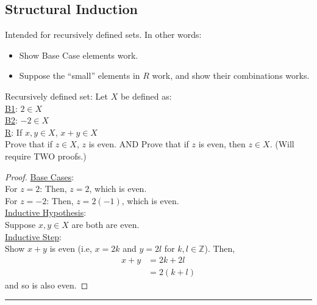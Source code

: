 \documentclass{article}
\def \proofDistance {5pt}
\newcommand{\proofseparator}{\par\noindent\rule{\textwidth}{0.4pt}}
\newcommand{\Z}{\ensuremath{\mathbb{Z}}}
\newcommand{\pf}[1]{
    \vspace{\proofDistance}
    \begin{proof}
    #1
    \end{proof}
    \proofseparator
}
\begin{document}
\newpage

    \subsection{Structural Induction}

        Intended for recursively defined sets. In other words: 

        \begin{itemize}
            \item Show Base Case elements work.
            \item Suppose the ``small'' elements in $R$ work, and show their combinations works.
        \end{itemize}
        
        \begin{example}
            Recursively defined set: Let $X$ be defined as: \\\underline{B1}: $2\in X$ \\
            \underline{B2}: $-2\in X$ \\
            \underline{R}: If $x,y\in X$, $x + y \in X$ \\
            Prove that if $z\in X$, $z$ is even. AND Prove that if $z$ is even, then $z\in X$. (Will require TWO proofs.)
        \end{example}
            
        \pf{
            \item \underline{Base Cases}: \\
            For $z = 2$: Then, $z = 2$, which is even. \\
            For $z = -2$: Then, $z = 2(-1)$, which is even. \\ 
    
            \noindent \underline{Inductive Hypothesis}: \\
            Suppose $x,y \in X$ are both are even. \\
    
            \noindent \underline{Inductive Step}: \\
            Show $x + y$ is even (i.e, $x = 2k$ and $ y = 2l$ for $k,l \in \Z$). Then, 
            \begin{align*}
                x + y &= 2k + 2l \\
                &= 2(k + l)
            \end{align*} and so is also even.
        }
\end{document}
